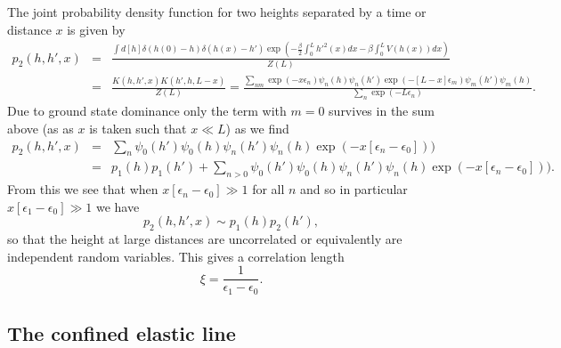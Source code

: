 The joint probability density function for two heights separated by a time or distance $x$ is given by
\begin{eqnarray}
p_2(h,h',x)&=& \frac{\int d[h]\delta(h(0)-h)\delta(h(x)-h')\exp\left(-\frac{\beta}{2}\int_0^L h'^2(x) dx -\beta\int_0^L  V(h(x)) dx\right)}{Z(L)}\\
&=& \frac{K(h,h',x)K(h',h,L-x)}{Z(L)} = \frac{\sum_{nm} \exp(-x\epsilon_n)\psi_n(h)\psi_n(h')\exp(-[L-x]\epsilon_m)\psi_m(h')\psi_m(h)}{\sum_n \exp(-L\epsilon_n)}.
\end{eqnarray}
Due to ground state dominance only the term with $m=0$ survives in the sum above (as
as $x$ is taken such that $x\ll L$) as we find
\begin{eqnarray}
p_2(h,h',x) &=& \sum_{n} \psi_0(h')\psi_0(h)\psi_n(h')\psi_n(h)\exp(-x[\epsilon_n-\epsilon_0]))\\
&=& p_1(h)p_1(h') + \sum_{n>0} \psi_0(h')\psi_0(h)\psi_n(h')\psi_n(h)\exp(-x[\epsilon_n-\epsilon_0])).
\end{eqnarray}
From this we see that when $x[\epsilon_n-\epsilon_0] \gg1 $ for all $n$ and so in particular $x[\epsilon_1-\epsilon_0] \gg1$ we have 
\begin{equation}
    p_2(h,h',x) \sim p_1(h)p_2(h'),
\end{equation}
so that the height at large distances are uncorrelated or equivalently are independent random variables. This gives a correlation length
\begin{equation}
    \xi = \frac{1}{\epsilon_1-\epsilon_0}.\label{clq}
\end{equation}

    \subsection{The confined elastic line}
    
